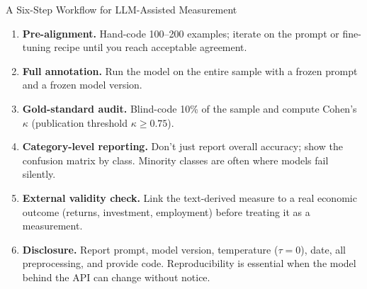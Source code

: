 \begin{frame}{A Six-Step Workflow for LLM-Assisted Measurement}
\begin{enumerate}
\item \textbf{Pre-alignment.} Hand-code 100--200 examples; iterate on the prompt or fine-tuning recipe until you reach acceptable agreement.
\medskip
\item \textbf{Full annotation.} Run the model on the entire sample with a frozen prompt and a frozen model version.
\medskip
\item \textbf{Gold-standard audit.} Blind-code 10\% of the sample and compute Cohen's $\kappa$ (publication threshold $\kappa \ge 0.75$).
\medskip
\item \textbf{Category-level reporting.} Don't just report overall accuracy; show the confusion matrix by class. Minority classes are often where models fail silently.
\medskip
\item \textbf{External validity check.} Link the text-derived measure to a real economic outcome (returns, investment, employment) before treating it as a measurement.
\medskip
\item \textbf{Disclosure.} Report prompt, model version, temperature ($\tau = 0$), date, all preprocessing, and provide code. Reproducibility is essential when the model behind the API can change without notice.
\end{enumerate}
\end{frame}

